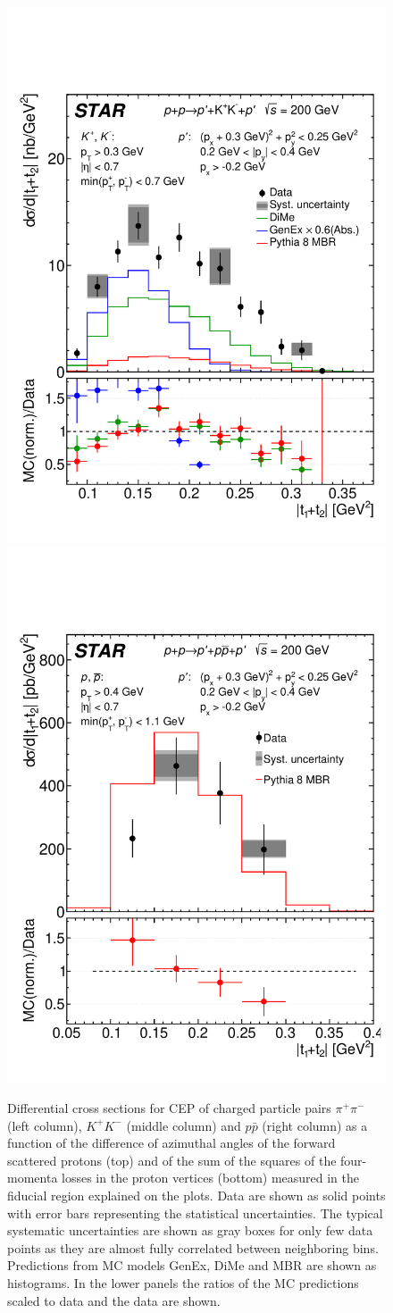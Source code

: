 \begin{figure}[h]
\hfill
\includegraphics[width=.31\textwidth,page=1]{graphics/physicsResults/Ratio_FinalResult_MandelstamTSum_kaon.pdf}
\hfill
\includegraphics[width=.31\textwidth,page=1]{graphics/physicsResults/Ratio_FinalResult_MandelstamTSum_proton.pdf}
%
\caption{Differential cross sections for CEP of charged particle pairs $\pi^+\pi^-$ (left column), $K^+K^-$ (middle column) and $p\bar{p}$ (right column) as a function of the difference of azimuthal angles of the forward scattered protons (top) and of the sum of the squares of the four-momenta losses in the proton vertices (bottom) measured in the fiducial region explained on the plots. Data are shown as solid points with error bars representing the statistical uncertainties. The typical systematic uncertainties are shown as gray boxes for only few data points as they are almost fully correlated between neighboring bins. Predictions from MC models GenEx, DiMe and MBR are shown as histograms. In the lower panels the ratios of the MC predictions scaled to data and the data are shown.}
\label{results_2}
\end{figure}
%
